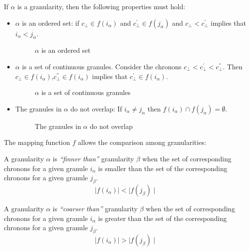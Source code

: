 If $\alpha$ is a granularity, then the following properties must hold:\\
\begin{itemize}
\item
$\alpha$ is an ordered set: if $c_\bot \in f(i_\alpha)$ and $c^{'}_\bot \in f(j_\alpha)$ and $c_\bot < c^{'}_\bot$ implies that $i_\alpha < j_\alpha$.
\begin{figure}
\centering

\caption{$\alpha$ is an ordered set}
\label{fig:granularity-prop1}
\end{figure}
\item
$\alpha$ is a set of continuous granules. Consider the chronons $c_\bot < c^{'}_\bot < c^{''}_\bot$. Then $c_\bot \in f(i_\alpha)$,$c^{''}_\bot \in f(i_\alpha)$ implies that $c^{'}_\bot \in f(i_\alpha)$.
\begin{figure}
\centering

\caption{$\alpha$ is a set of continuous granules}
\label{fig:granularity-prop2}
\end{figure}
\item
The granules in $\alpha$ do not overlap: If $i_\alpha \neq j_\alpha$ then $f(i_\alpha) \cap f(j_\alpha) = \emptyset$.
\begin{figure}
\centering

\caption{The granules in $\alpha$ do not overlap}
\label{fig:granularity-prop3}
\end{figure}
\end{itemize}

The mapping function $f$ allows the comparison among granularities:

\begin{definition}
\label{def:finner-than}
A granularity $\alpha$ is \emph{``finner than''} granularity $\beta$ when the set of corresponding chronons for a given granule $i_\alpha$ is smaller than the set of the corresponding chronons for a given granule $j_\beta$.
\begin{equation}
\label{eq:finner-than}
\mid f \left( i_\alpha \right) \mid < \mid  f \left( j_\beta \right) \mid
\end{equation} 
\end{definition}

\begin{definition}
\label{def:coarser-than}
A granularity $\alpha$ is \emph{``coarser than''} granularity $\beta$ when the set of corresponding chronons for a given granule $i_\alpha$ is greater than the set of the corresponding chronons for a given granule $j_\beta$.
\begin{equation}
\label{eq:coarser-than}
\mid f \left( i_\alpha \right) \mid > \mid  f \left( j_\beta \right) \mid
\end{equation} 
\end{definition}




